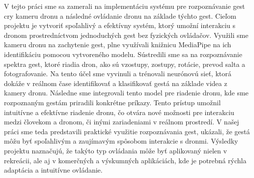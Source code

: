 V tejto práci sme sa zamerali na implementáciu systému pre rozpoznávanie gest cry kameru dronu a následné ovládanie dronu na základe týchto gest. Cieľom projektu je vytvoriť spoľahlivý a efektívny systém, ktorý umožní interakciu s dronom prostredníctvom jednoduchých gest bez fyzických ovládačov.\newline
Využili sme kameru dronu na zachytenie gest, plne využívali knižnicu MediaPipe na ich identifikáciu pomocou vytvoreného modelu. Sústredili sme sa na rozpoznávanie spektra gest, ktoré riadia dron, ako sú vzostupy, zostupy, rotácie, prevod salta a fotografovanie. Na tento účel sme vyvinuli a trénovali neurónovú sieť, ktorá dokáže v reálnom čase identifikovať a klasifikovať gestá na základe videa z kamery dronu.
Následne sme integrovali tento model pre riadenie dronu, kde sme rozpoznaným gestám priradili konkrétne príkazy. Tento prístup umožnil intuitívne a efektívne riadenie dronu, čo otvára nové možnosti pre interakciu medzi človekom a dronom, či inými zariadeniami v reálnom prostredí.\newline
V našej práci sme teda predstavili praktické využitie rozpoznávania gest, ukázali, že gestá môžu byť spoľahlivým a zaujímavým spôsobom interakcie s dronmi. Výsledky projektu naznačujú, že takýto typ ovládania môže byť aplikovaný nielen v rekreácii, ale aj v komerčných a výskumných aplikáciách, kde je potrebná rýchla adaptácia a intuitívne ovládanie. 